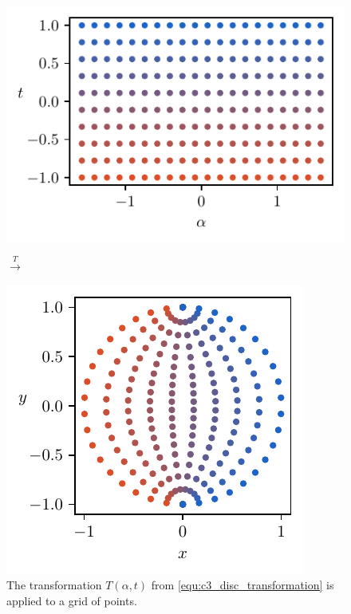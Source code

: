 \begin{figure}
  \begin{center}
    \begin{minipage}{.53\textwidth}
      \includegraphics[scale=.75]{img/chapter3/on_disc/disc_original.pdf}%
    \end{minipage}\begin{minipage}{.05\textwidth}\begin{center}
        \Large $ \xrightarrow{T} $
      \end{center}
    \end{minipage}\begin{minipage}{.42\textwidth}\centering
      \includegraphics[scale=.75]{img/chapter3/on_disc/disc_transformed.pdf}
    \end{minipage}
  \end{center}
  \caption{The transformation $T(\alpha, t)$ from \eqref{equ:c3_disc_transformation} is applied to a grid of points.}
  \label{fig:c3_disc_transformation}
\end{figure}

